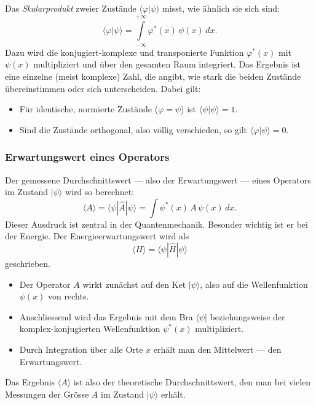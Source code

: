 Das \emph{Skalarprodukt} zweier Zustände $\langle \varphi | \psi \rangle$ misst, wie ähnlich sie sich sind:
%
\begin{equation}
\langle \varphi | \psi \rangle = \int\limits_{-\infty}^{+\infty} \varphi^*(x)\,\psi(x)\,dx.
\end{equation}
Dazu wird die konjugiert-komplexe und transponierte Funktion $\varphi^*(x)$ mit $\psi(x)$ multipliziert und über den gesamten Raum integriert.
Das Ergebnis ist eine einzelne (meist komplexe) Zahl, die angibt, wie stark die beiden Zustände übereinstimmen oder sich unterscheiden. 
Dabei gilt:
\begin{itemize}
	\item Für identische, normierte Zustände ($\varphi = \psi$) ist $\langle \psi | \psi \rangle = 1$.
	\item Sind die Zustände orthogonal, also völlig verschieden, so gilt $\langle \varphi | \psi \rangle  = 0$.
\end{itemize}

\subsubsection{Erwartungswert eines Operators\label{fourier:subsubsection:erwartungswertEinesOperators}}
Der gemessene Durchschnittswert --- also der Erwartungswert --- eines Operators im Zustand $|\psi\rangle$ wird so berechnet:
%
\begin{equation}
	\langle A \rangle = \langle \psi | \hat{A} | \psi \rangle = \int \psi^*(x)\,A\,\psi(x)\,dx.
\end{equation}
Dieser Ausdruck ist zentral in der Quantenmechanik.
Besonder wichtig ist er bei der Energie. Der Energieerwartungswert wird als
\begin{equation}
	\langle H \rangle = \langle \psi|\hat{H}|\psi \rangle
\end{equation}
geschrieben.
\begin{itemize}
	\item Der Operator $A$ wirkt zunächst auf den Ket $|\psi\rangle$, also auf die Wellenfunktion $\psi(x)$ von rechts.
	\item Anschliessend wird das Ergebnis mit dem Bra $\langle \psi|$ beziehungsweise der komplex-konjugierten Wellenfunktion $\psi^*(x)$ multipliziert.
	\item Durch Integration über alle Orte $x$ erhält man den Mittelwert --- den Erwartungswert.
\end{itemize}
Das Ergebnis $\langle A \rangle$ ist also der theoretische Durchschnittswert, den man bei vielen Messungen der Grösse $A$ im Zustand $|\psi\rangle$ erhält.

